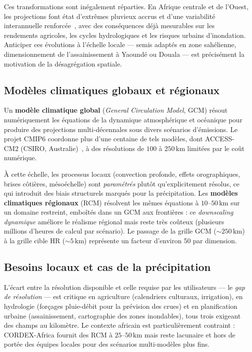\documentclass[14pt,a4paper,openany]{extreport}
\theoremstyle{definition}
\begin{document}
Ces transformations sont inégalement réparties. En Afrique centrale et de l'Ouest, les projections font état d'extrêmes pluvieux accrus et d'une variabilité interannuelle renforcée~\cite{ipcc_ar6_2021,almazroui_2020}, avec des conséquences déjà mesurables sur les rendements agricoles, les cycles hydrologiques et les risques urbains d'inondation. Anticiper ces évolutions à l'échelle locale --- semis adaptés en zone sahélienne, dimensionnement de l'assainissement à Yaoundé ou Douala --- est précisément la motivation de la désagrégation spatiale.

\subsection{Modèles climatiques globaux et régionaux}
\label{ssec:gcm-rcm}

Un \textbf{modèle climatique global} (\emph{General Circulation Model}, GCM) résout numériquement les équations de la dynamique atmosphérique et océanique pour produire des projections multi-décennales sous divers scénarios d'émissions. Le projet CMIP6 coordonne plus d'une centaine de tels modèles, dont ACCESS-CM2 (CSIRO, Australie)~\cite{eyring_cmip6_2016}, à des résolutions de $100$ à $250\,\mathrm{km}$ limitées par le coût numérique.

À cette échelle, les processus locaux (convection profonde, effets orographiques, brises côtières, mésoéchelle) sont \emph{paramétrés} plutôt qu'explicitement résolus, ce qui introduit des biais structurels marqués pour la précipitation. Les \textbf{modèles climatiques régionaux} (RCM) résolvent les mêmes équations à $10$--$50\,\mathrm{km}$ sur un domaine restreint, emboîtés dans un GCM aux frontières : ce \emph{downscaling dynamique} améliore le réalisme régional mais reste très coûteux (plusieurs millions d'heures de calcul par scénario). Le passage de la grille GCM ($\sim$$250\,\mathrm{km}$) à la grille cible HR ($\sim$$5\,\mathrm{km}$) représente un facteur d'environ 50 par dimension.
\label{fig:resolutions}

\subsection{Besoins locaux et cas de la précipitation}
\label{ssec:besoin-local}

L'écart entre la résolution disponible et celle requise par les utilisateurs --- le \emph{gap de résolution} --- est critique en agriculture (calendriers culturaux, irrigation), en hydrologie (forçages pluie-débit pour la prévision des crues) et en planification urbaine (assainissement, cartographie des zones inondables), tous trois exigeant des champs au kilomètre. Le contexte africain est particulièrement contraint : CORDEX-Africa fournit des RCM à $25$--$50\,\mathrm{km}$ mais reste lacunaire et hors de portée des équipes locales pour des scénarios multi-modèles plus fins.
\end{document}
